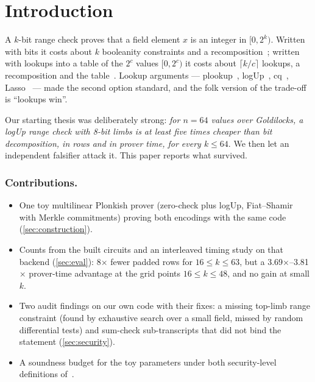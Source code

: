 \section{Introduction}\label{sec:intro}

A $k$-bit range check proves that a field element $x$ is an integer in $[0, 2^k)$. Written with bits it costs
about $k$ booleanity constraints and a recomposition~\cite[§6.5.4]{Thaler}; written with lookups into a table of
the $2^c$ values $[0, 2^c)$ it costs about $\lceil k/c \rceil$ lookups, a recomposition and the
table~\cite[§6.6.3]{Thaler}. Lookup arguments --- plookup~\cite{GW20}, logUp~\cite{Hab22}, cq~\cite{EFG22},
Lasso~\cite{STW24} --- made the second option standard, and the folk version of the trade-off is ``lookups win''.

Our starting thesis was deliberately strong: \emph{for $n = 64$ values over Goldilocks, a logUp range check with
8-bit limbs is at least five times cheaper than bit decomposition, in rows and in prover time, for every
$k \le 64$}. We then let an independent falsifier attack it. This paper reports what survived.

\subsubsection{Contributions.}
\begin{itemize}
\item One toy multilinear Plonkish prover (zero-check plus logUp, Fiat--Shamir with Merkle commitments) proving
  both encodings with the same code (\cref{sec:construction}).
\item Counts from the built circuits and an interleaved timing study on that backend (\cref{sec:eval}): 8$\times$
  fewer padded rows for $16 \le k \le 63$, but a 3.69$\times$--3.81$\times$ prover-time advantage at the
  grid points $16 \le k \le 48$, and no gain at small $k$.
\item Two audit findings on our own code with their fixes: a missing top-limb range constraint (found by
  exhaustive search over a small field, missed by random differential tests) and sum-check sub-transcripts that
  did not bind the statement (\cref{sec:security}).
\item A soundness budget for the toy parameters under both security-level definitions of~\cite{CY24}.
\end{itemize}

